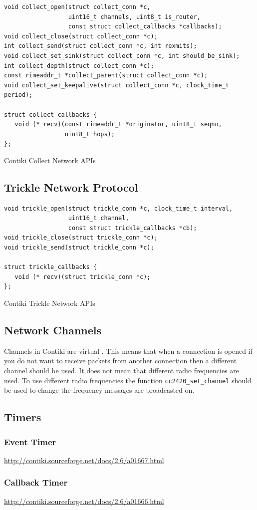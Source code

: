 \begin{listing}[H]
\begin{verbatim}
void collect_open(struct collect_conn *c,
                  uint16_t channels, uint8_t is_router,
                  const struct collect_callbacks *callbacks);
void collect_close(struct collect_conn *c);
int collect_send(struct collect_conn *c, int rexmits);
void collect_set_sink(struct collect_conn *c, int should_be_sink);
int collect_depth(struct collect_conn *c);
const rimeaddr_t *collect_parent(struct collect_conn *c);
void collect_set_keepalive(struct collect_conn *c, clock_time_t period);

struct collect_callbacks {
   void (* recv)(const rimeaddr_t *originator, uint8_t seqno,
                 uint8_t hops);
};
\end{verbatim}
\caption{Contiki Collect Network APIs}
\end{listing}


\subsection{Trickle Network Protocol}

\begin{listing}[H]
\begin{verbatim}
void trickle_open(struct trickle_conn *c, clock_time_t interval,
                  uint16_t channel,
                  const struct trickle_callbacks *cb);
void trickle_close(struct trickle_conn *c);
void trickle_send(struct trickle_conn *c);

struct trickle_callbacks {
   void (* recv)(struct trickle_conn *c);
};
\end{verbatim}
\caption{Contiki Trickle Network APIs}
\end{listing}


\subsection{Network Channels}

Channels in Contiki are virtual \cite{tel-aviv-contiki-exercises, Dunkels:2007:ACA:1322263.1322295}. This means that when a connection is opened if you do not want to receive packets from another connection then a different channel should be used. It does not mean that different radio frequencies are used. To use different radio frequencies the function \verb|cc2420_set_channel| should be used to change the frequency messages are broadcasted on.


\subsection{Timers}

\subsubsection{Event Timer}

\url{http://contiki.sourceforge.net/docs/2.6/a01667.html}

\subsubsection{Callback Timer}

\url{http://contiki.sourceforge.net/docs/2.6/a01666.html}
